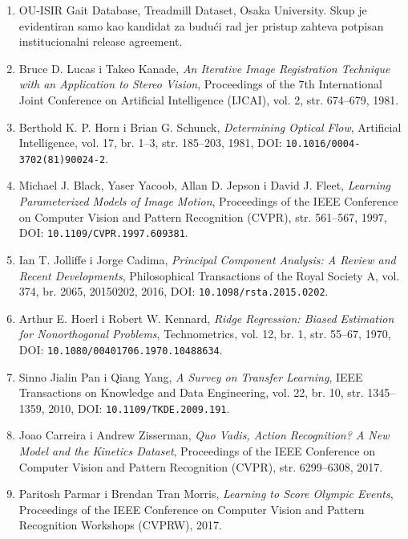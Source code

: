 ﻿\documentclass[12pt,a4paper]{report}
\begin{document}
\begin{enumerate}
  \item OU-ISIR Gait Database, Treadmill Dataset, Osaka University. Skup je
  evidentiran samo kao kandidat za budući rad jer pristup zahteva potpisan
  institucionalni release agreement.

  \item Bruce D. Lucas i Takeo Kanade, \textit{An Iterative Image Registration
  Technique with an Application to Stereo Vision}, Proceedings of the 7th
  International Joint Conference on Artificial Intelligence (IJCAI), vol. 2,
  str. 674--679, 1981.

  \item Berthold K. P. Horn i Brian G. Schunck, \textit{Determining Optical Flow},
  Artificial Intelligence, vol. 17, br. 1--3, str. 185--203, 1981,
  DOI: \texttt{10.1016/0004-3702(81)90024-2}.

  \item Michael J. Black, Yaser Yacoob, Allan D. Jepson i David J. Fleet,
  \textit{Learning Parameterized Models of Image Motion}, Proceedings of the
  IEEE Conference on Computer Vision and Pattern Recognition (CVPR),
  str. 561--567, 1997, DOI: \texttt{10.1109/CVPR.1997.609381}.

  \item Ian T. Jolliffe i Jorge Cadima, \textit{Principal Component Analysis:
  A Review and Recent Developments}, Philosophical Transactions of the Royal
  Society A, vol. 374, br. 2065, 20150202, 2016,
  DOI: \texttt{10.1098/rsta.2015.0202}.

  \item Arthur E. Hoerl i Robert W. Kennard, \textit{Ridge Regression: Biased
  Estimation for Nonorthogonal Problems}, Technometrics, vol. 12, br. 1,
  str. 55--67, 1970, DOI: \texttt{10.1080/00401706.1970.10488634}.

  \item Sinno Jialin Pan i Qiang Yang, \textit{A Survey on Transfer Learning},
  IEEE Transactions on Knowledge and Data Engineering, vol. 22, br. 10,
  str. 1345--1359, 2010, DOI: \texttt{10.1109/TKDE.2009.191}.

  \item Joao Carreira i Andrew Zisserman, \textit{Quo Vadis, Action Recognition?
  A New Model and the Kinetics Dataset}, Proceedings of the IEEE Conference on
  Computer Vision and Pattern Recognition (CVPR), str. 6299--6308, 2017.

  \item Paritosh Parmar i Brendan Tran Morris, \textit{Learning to Score Olympic
  Events}, Proceedings of the IEEE Conference on Computer Vision and Pattern
  Recognition Workshops (CVPRW), 2017.


\end{enumerate}
\end{document}
